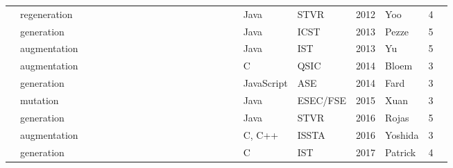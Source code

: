 \begin{table*}
\begin{adjustbox}{max width=\textwidth,center=\textwidth}
\begin{tabular}{l|l|llll|llllll|llllll|l|llll|l}
            \cite{yoo2012}                                  & regeneration                      & \X &    &    &    & \X &    &    &    &    &    & \X &    &    &    &    & \X & Java        & STVR                                                     & 2012 & Yoo            & 4 \\
            \cite{pezze2013}                                & generation                        & \X &    &    &    &    &    & \X &    &    &    & \X &    &    &    &    &    & Java        & ICST                                                     & 2013 & Pezze          & 5 \\
            \cite{Yu2013}                                   & augmentation                      & \X &    &    &    &    &    &    & \X &    &    & \X &    &    &    &    &    & Java        & IST                                                      & 2013 & Yu             & 5 \\
            \cite{6958388}                                  & augmentation                      & \X &    &    &    & \X &    &    &    &    &    & \X &    &    &    & \X &    & C           & QSIC                                                     & 2014 & Bloem          & 3 \\
            \cite{milani2014}                               & generation                        & \X &    &    &    &    &    & \X &    &    &    & \X &    &    &    &    &    & JavaScript  & ASE                                                      & 2014 & Fard           & 3 \\
            \cite{Xuan:2015:CRV:2786805.2803206}            & mutation                          & \X &    &    &    &    & \X &    &    &    &    & \X &    &    &    &    &    & Java        & ESEC/FSE                                                 & 2015 & Xuan           & 3 \\
            \cite{rojas2016seeding}                         & generation                        & \X &    &    &    & \X &    &    &    &    &    & \X &    &    &    &    & \X & Java        & STVR                                                     & 2016 & Rojas          & 5 \\
            \cite{Yoshida2016}                              & augmentation                      & \X &    &    & \X & \X &    &    &    &    &    & \X &    &    &    & \X &    & C, C++      & ISSTA                                                    & 2016 & Yoshida        & 3 \\
            \cite{Patrick201736}                            & generation                        & \X &    &    &    &    &    & \X &    &    &    &    &    &    &    &    & \X & C           & IST                                                      & 2017 & Patrick        & 4 \\

\end{tabular}
\end{adjustbox}
\end{table*}
